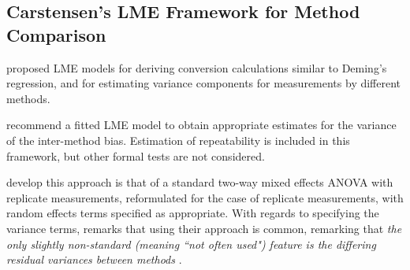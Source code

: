 \documentclass[12pt, a4paper]{report}
\theoremstyle{plain}
\theoremstyle{definition}
\theoremstyle{remark}
\begin{document}

\subsection{Carstensen's LME Framework for Method Comparison}

\citet{BXC2004} proposed LME models for deriving conversion calculations similar to Deming's regression, and for
estimating variance components for measurements by different methods.

\citet{BXC2008} recommend a fitted LME model to obtain appropriate estimates for the variance of the inter-method bias.  Estimation of repeatability is included in this framework, but other formal tests are not considered.



\citet{BXC2008} develop this approach is that of a standard two-way mixed effects ANOVA with replicate measurements, reformulated for the case of replicate measurements, with random effects terms specified as appropriate. With regards to specifying the variance terms, \citet{BXC2008} remarks that using their approach is common, remarking that \emph{the only slightly non-standard (meaning ``not often used") feature is the differing residual variances between methods }\citep{BXC2010}.





%
\end{document}
